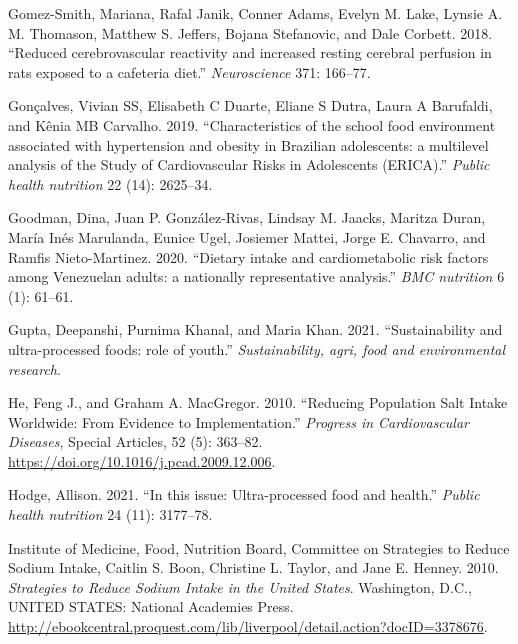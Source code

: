 \documentclass[
]{article}
\newlength{\cslhangindent}
\newlength{\cslentryspacingunit} %
\newenvironment{CSLReferences}[2] %
 {%
  \setlength{\parindent}{0pt}
  \ifodd #1
  \let\oldpar\par
  \def\par{\hangindent=\cslhangindent\oldpar}
  \fi
  \setlength{\parskip}{#2\cslentryspacingunit}
 }%
 {}
\begin{document}
\begin{CSLReferences}{1}{0}
\leavevmode{}%
Gomez-Smith, Mariana, Rafal Janik, Conner Adams, Evelyn M. Lake, Lynsie
A. M. Thomason, Matthew S. Jeffers, Bojana Stefanovic, and Dale Corbett.
2018. {``Reduced cerebrovascular reactivity and increased resting
cerebral perfusion in rats exposed to a cafeteria diet.''}
\emph{Neuroscience} 371: 166--77.

\leavevmode{}%
Gonçalves, Vivian SS, Elisabeth C Duarte, Eliane S Dutra, Laura A
Barufaldi, and Kênia MB Carvalho. 2019. {``Characteristics of the school
food environment associated with hypertension and obesity in Brazilian
adolescents: a multilevel analysis of the Study of Cardiovascular Risks
in Adolescents (ERICA).''} \emph{Public health nutrition} 22 (14):
2625--34.

\leavevmode{}%
Goodman, Dina, Juan P. González-Rivas, Lindsay M. Jaacks, Maritza Duran,
María Inés Marulanda, Eunice Ugel, Josiemer Mattei, Jorge E. Chavarro,
and Ramfis Nieto-Martinez. 2020. {``Dietary intake and cardiometabolic
risk factors among Venezuelan adults: a nationally representative
analysis.''} \emph{BMC nutrition} 6 (1): 61--61.

\leavevmode{}%
Gupta, Deepanshi, Purnima Khanal, and Maria Khan. 2021.
{``Sustainability and ultra-processed foods: role of youth.''}
\emph{Sustainability, agri, food and environmental research}.

\leavevmode{}%
He, Feng J., and Graham A. MacGregor. 2010. {``Reducing Population Salt
Intake Worldwide: From Evidence to Implementation.''} \emph{Progress in
Cardiovascular Diseases}, Special Articles, 52 (5): 363--82.
\url{https://doi.org/10.1016/j.pcad.2009.12.006}.

\leavevmode{}%
Hodge, Allison. 2021. {``In this issue: Ultra-processed food and
health.''} \emph{Public health nutrition} 24 (11): 3177--78.

\leavevmode{}%
Institute of Medicine, Food, Nutrition Board, Committee on Strategies to
Reduce Sodium Intake, Caitlin S. Boon, Christine L. Taylor, and Jane E.
Henney. 2010. \emph{Strategies to Reduce Sodium Intake in the United
States}. Washington, D.C., UNITED STATES: National Academies Press.
\url{http://ebookcentral.proquest.com/lib/liverpool/detail.action?docID=3378676}.


\end{CSLReferences}
\end{document}
